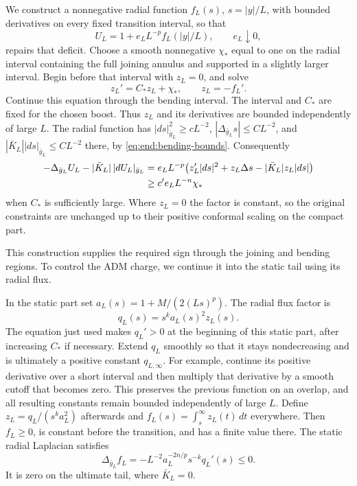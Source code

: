 We construct a nonnegative radial function $f_L(s)$,
$s=|y|/L$, with bounded derivatives on every fixed transition
interval, so that
\begin{equation}\label{eq:end:repair-factor}
 U_L=1+e_LL^{-p}f_L(|y|/L),\qquad e_L\downarrow0,
\end{equation}
repairs that deficit.  Choose a smooth nonnegative $\chi_*$
equal to one on the radial interval containing the full joining
annulus and supported in a slightly larger interval.  Begin
before that interval with $z_L=0$, and solve
\[
 z_L'=C_*z_L+\chi_*,\qquad z_L=-f_L'.
\]
Continue this equation through the bending interval.  The
interval and $C_*$ are fixed for the chosen boost.  Thus $z_L$
and its derivatives are bounded independently of large $L$.
The radial function has $|ds|_{\bar g_L}^2\ge cL^{-2}$,
$|\Delta_{\bar g_L}s|\le CL^{-2}$, and
$|\bar K_L||ds|_{\bar g_L}\le CL^{-2}$ there, by
\eqref{eq:end:bending-bounds}.  Consequently
\begin{align}
 -\Delta_{\bar g_L}U_L-|\bar K_L|\,|dU_L|_{\bar g_L}
 &=e_LL^{-p}\bigl(z_L'|ds|^2+z_L\Delta s
                             -|\bar K_L|z_L|ds|\bigr)\notag\\
 &\ge c'e_LL^{-n}\chi_*                         \label{eq:end:repair-sign}
\end{align}
when $C_*$ is sufficiently large.  Where $z_L=0$ the factor
is constant, so the original constraints are unchanged up to their
positive conformal scaling on the compact part.

This construction supplies the required sign through the joining
and bending regions.  To control the ADM charge, we continue it into
the static tail using its radial flux.

In the static part set $a_L(s)=1+M/(2(Ls)^p)$.  The radial flux factor is
\[
 q_L(s)=s^ka_L(s)^2z_L(s).
\]
The equation just used makes $q_L'>0$ at the beginning of this
static part, after increasing $C_*$ if necessary.  Extend
$q_L$ smoothly so that it stays nondecreasing and is ultimately
a positive constant $q_{L,\infty}$.  For example, continue its
positive derivative over a short interval and then multiply
that derivative by a smooth cutoff that becomes zero.  This
preserves the previous function on an overlap, and all resulting
constants remain bounded independently of large $L$.
Define $z_L=q_L/(s^ka_L^2)$ afterwards and
$f_L(s)=\int_s^\infty z_L(t)\,dt$ everywhere.  Then $f_L\ge0$,
is constant before the transition, and has a finite value there.
The static radial Laplacian satisfies
\[
 \Delta_{\bar g_L}f_L
 =-L^{-2}a_L^{-2n/p}s^{-k}q_L'(s)\le0.
\]
It is zero on the ultimate tail, where $\bar K_L=0$.


